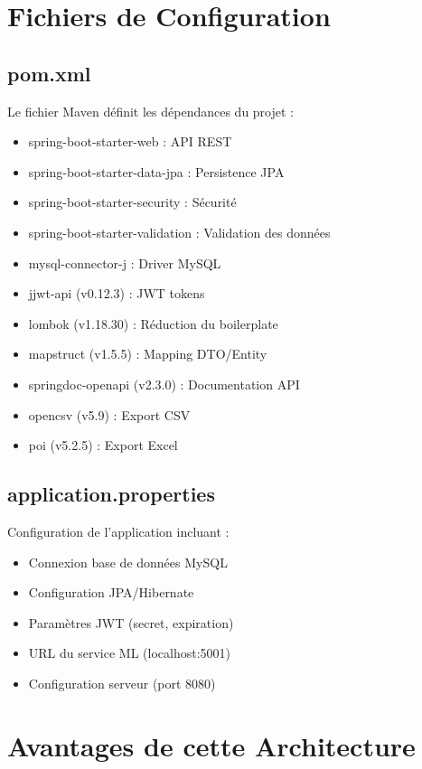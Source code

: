 \documentclass[12pt,a4paper]{report}
\begin{document}
\section{Fichiers de Configuration}

\subsection{pom.xml}

Le fichier Maven définit les dépendances du projet :

\begin{itemize}[noitemsep]
    \item spring-boot-starter-web : API REST
    \item spring-boot-starter-data-jpa : Persistence JPA
    \item spring-boot-starter-security : Sécurité
    \item spring-boot-starter-validation : Validation des données
    \item mysql-connector-j : Driver MySQL
    \item jjwt-api (v0.12.3) : JWT tokens
    \item lombok (v1.18.30) : Réduction du boilerplate
    \item mapstruct (v1.5.5) : Mapping DTO/Entity
    \item springdoc-openapi (v2.3.0) : Documentation API
    \item opencsv (v5.9) : Export CSV
    \item poi (v5.2.5) : Export Excel
\end{itemize}

\subsection{application.properties}

Configuration de l'application incluant :
\begin{itemize}[noitemsep]
    \item Connexion base de données MySQL
    \item Configuration JPA/Hibernate
    \item Paramètres JWT (secret, expiration)
    \item URL du service ML (localhost:5001)
    \item Configuration serveur (port 8080)
\end{itemize}

\section{Avantages de cette Architecture}
\end{document}

